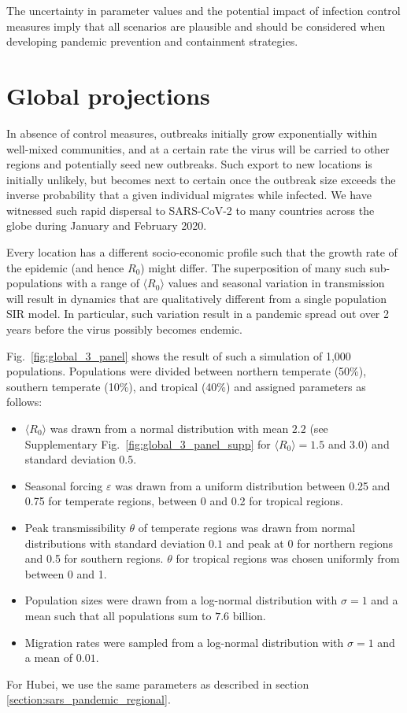 \documentclass[rmp, reprint, superscriptaddress, floatfix,amsmath]{revtex4-1}
\newcommand{\forcing}{\varepsilon}
\begin{document}
The uncertainty in parameter values and the potential impact of infection control measures imply that all scenarios are plausible and should be considered when developing pandemic prevention and containment strategies.


\section{Global projections}
In absence of control measures, outbreaks initially grow exponentially within well-mixed communities, and at a certain rate the virus will be carried to other regions and potentially seed new outbreaks.
Such export to new locations is initially unlikely, but becomes next to certain once the outbreak size exceeds the inverse probability that a given individual migrates while infected.
We have witnessed such rapid dispersal to SARS-CoV-2 to many countries across the globe during January and February 2020.

Every location has a different socio-economic profile such that the growth rate of the epidemic (and hence $R_0$) might differ.
The superposition of many such sub-populations with a range of $\langle R_0 \rangle$ values and seasonal variation in transmission will result in dynamics that are qualitatively different from a single population SIR model.
In particular, such variation result in a pandemic spread out over 2 years before the virus possibly becomes endemic.

Fig.~\ref{fig:global_3_panel} shows the result of such a simulation of 1,000 populations.
Populations were divided between northern temperate (50\%), southern temperate (10\%), and tropical (40\%) and assigned parameters as follows:
\begin{itemize}
    \item $\langle R_0 \rangle$ was drawn from a normal distribution with mean $2.2$ (see Supplementary Fig.~\ref{fig:global_3_panel_supp} for $\langle R_0 \rangle=1.5$ and 3.0) and standard deviation $0.5$.
    \item Seasonal forcing $\forcing$ was drawn from a uniform distribution between 0.25 and 0.75 for temperate regions, between 0 and 0.2 for tropical regions.
    \item Peak transmissibility $\theta$ of temperate regions was drawn from normal distributions with standard deviation $0.1$ and peak at $0$ for northern regions and 0.5 for southern regions. $\theta$ for tropical regions was chosen uniformly from between 0 and 1.
    \item Population sizes were drawn from a log-normal distribution with $\sigma=1$ and a mean such that all populations sum to $7.6$ billion.
    \item Migration rates were sampled from a log-normal distribution with $\sigma=1$ and a mean of $0.01$.
\end{itemize}
For Hubei, we use the same parameters as described in section \ref{section:sars_pandemic_regional}.
\end{document}
